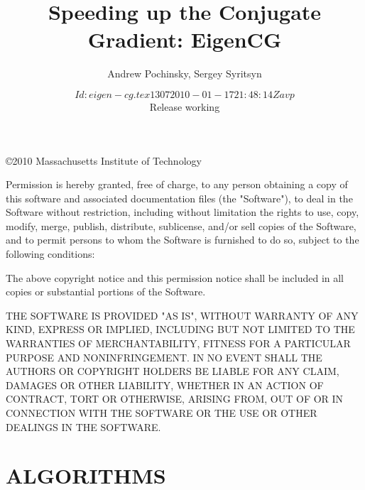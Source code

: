 \documentclass[oneside,openright]{report}
\title{Speeding up the Conjugate Gradient: EigenCG}
\author{Andrew Pochinsky, Sergey Syritsyn}
\date{$Id: eigen-cg.tex 1307 2010-01-17 21:48:14Z avp $\\
Release working}
\begin{document}
\maketitle
\thispagestyle{empty}\hbox{}
\vfill
\copyright 2010 Massachusetts Institute of Technology

Permission is hereby granted, free of charge, to any person obtaining
a copy of this software and associated documentation files (the
"Software"), to deal in the Software without restriction, including
without limitation the rights to use, copy, modify, merge, publish,
distribute, sublicense, and/or sell copies of the Software, and to
permit persons to whom the Software is furnished to do so, subject to
the following conditions:

The above copyright notice and this permission notice shall be
included in all copies or substantial portions of the Software.

THE SOFTWARE IS PROVIDED "AS IS", WITHOUT WARRANTY OF ANY KIND,
EXPRESS OR IMPLIED, INCLUDING BUT NOT LIMITED TO THE WARRANTIES OF
MERCHANTABILITY, FITNESS FOR A PARTICULAR PURPOSE AND
NONINFRINGEMENT. IN NO EVENT SHALL THE AUTHORS OR COPYRIGHT HOLDERS BE
LIABLE FOR ANY CLAIM, DAMAGES OR OTHER LIABILITY, WHETHER IN AN ACTION
OF CONTRACT, TORT OR OTHERWISE, ARISING FROM, OUT OF OR IN CONNECTION
WITH THE SOFTWARE OR THE USE OR OTHER DEALINGS IN THE SOFTWARE.
\pagebreak

\tableofcontents

\listofalgorithms

\chapter{ALGORITHMS}
\end{document}
